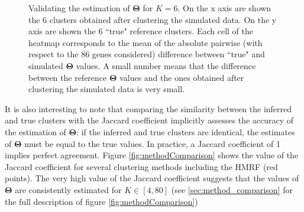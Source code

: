 \begin{figure}[bth]
        \myfloatalign
         \quad
        \caption{Validating the estimation of $\boldsymbol{\Theta}$ for $K=6$. On the x axis are shown the 6 clusters obtained after clustering the simulated data. On the y axis are shown the 6 ``true" reference clusters. Each cell of the heatmap corresponds to the mean of the absolute pairwise (with respect to the 86 genes considered) difference between ``true" and simulated $\boldsymbol{\Theta}$ values. A small number means that the difference between the reference $\boldsymbol{\Theta}$ values and the ones obtained after clustering the simulated data is very small.}\label{fig:theta_valid}
\end{figure}
	
	It is also interesting to note that comparing the similarity between the inferred and true clusters with the Jaccard coefficient implicitly assesses the accuracy of the estimation of $\boldsymbol{\Theta}$: if the inferred and true clusters are identical, the estimates of $\boldsymbol{\Theta}$ must be equal to the true values. In practice, a Jaccard coefficient of 1 implies perfect agreement. Figure \ref{fig:methodComparison} shows the value of the Jaccard coefficient for several clustering methods including the HMRF (red points). The very high value of the Jaccard coefficient suggests that the values of $\boldsymbol{\Theta}$ are consistently estimated for $K \in [4,80]$ (see \ref{sec:method_comparison} for the full description of figure \ref{fig:methodComparison})\\
	

